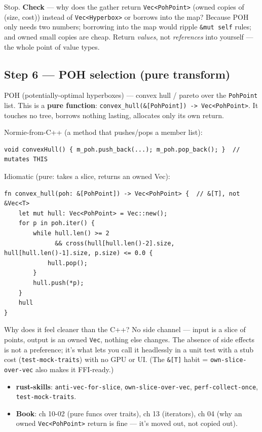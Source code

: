 \documentclass[11pt]{article}
\begin{document}
Stop. \textbf{\textbf{Check}} — why does the gather return \texttt{Vec<PohPoint>} (owned copies of
(size, cost)) instead of \texttt{Vec<Hyperbox>} or borrows into the map? Because POH
only needs two numbers; borrowing into the map would ripple \texttt{\&mut self} rules;
and owned small copies are cheap. Return \emph{values}, not \emph{references} into
yourself — the whole point of value types.
\subsection{Step 6 — POH selection (pure transform)}
\label{sec:org7536280}

POH (potentially-optimal hyperboxes) — convex hull / pareto over the \texttt{PohPoint}
list. This is a \textbf{\textbf{pure function}}: \texttt{convex\_hull(\&[PohPoint]) -> Vec<PohPoint>}. It
touches no tree, borrows nothing lasting, allocates only its own return.

Normie-from-C++ (a method that pushes/pops a member list):
\begin{verbatim}
void convexHull() { m_poh.push_back(...); m_poh.pop_back(); }  // mutates THIS
\end{verbatim}

Idiomatic (pure: takes a slice, returns an owned Vec):
\begin{verbatim}
fn convex_hull(poh: &[PohPoint]) -> Vec<PohPoint> {  // &[T], not &Vec<T>
    let mut hull: Vec<PohPoint> = Vec::new();
    for p in poh.iter() {
        while hull.len() >= 2
              && cross(hull[hull.len()-2].size, hull[hull.len()-1].size, p.size) <= 0.0 {
            hull.pop();
        }
        hull.push(*p);
    }
    hull
}
\end{verbatim}

Why does it feel cleaner than the C++? No side channel — input is a slice of
points, output is an owned \texttt{Vec}, nothing else changes. The absence of side
effects is not a preference; it's what lets you call it headlessly in a unit
test with a stub cost (\texttt{test-mock-traits}) with no GPU or UI. (The \texttt{\&[T]} habit
= \texttt{own-slice-over-vec} also makes it FFI-ready.)

\begin{itemize}
\item \textbf{\textbf{rust-skills}}: \texttt{anti-vec-for-slice}, \texttt{own-slice-over-vec}, \texttt{perf-collect-once},
\texttt{test-mock-traits}.
\item \textbf{\textbf{Book}}: ch 10-02 (pure funcs over traits), ch 13 (iterators), ch 04 (why an
owned \texttt{Vec<PohPoint>} return is fine — it's moved out, not copied out).
\end{itemize}
\end{document}
